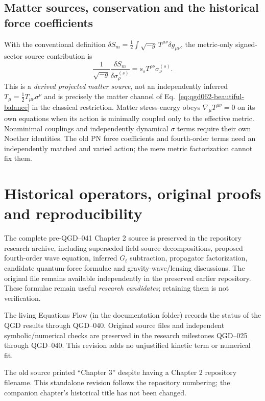 \documentclass[11pt,a4paper]{article}
\begin{document}
\subsection{Matter sources, conservation and the historical force coefficients}
With the conventional definition
$\delta S_m=\frac12\int\!\sqrt{-g}\,T^{\mu\nu}\delta g_{\mu\nu}$,
the metric-only signed-sector source contribution is
\begin{equation}\label{eq:qgd052-matter-source}
 \frac1{\sqrt{-g}}\frac{\delta S_m}{\delta\sigma_\rho^{(s)}}
 =s_s T^{\rho\nu}\sigma_\nu^{(s)}.
\end{equation}
This is a \emph{derived projected matter source}, not an independently inferred
$T_\mu=\frac12 T_{\mu\nu}\sigma^\nu$ and is precisely the matter channel of Eq.~\eqref{eq:qgd062-beautiful-balance} in the classical restriction.  Matter stress-energy obeys
$\nabla_\mu T^{\mu\nu}=0$ on its own equations when its action is
minimally coupled only to the effective metric.  Nonminimal couplings and
independently dynamical $\sigma$ terms require their own Noether identities.
The old PN force coefficients and fourth-order terms need an independently
matched and varied action; the mere metric factorization cannot fix them.

\section{Historical operators, original proofs and reproducibility}\label{app:archival}
The complete pre-QGD--041 Chapter 2 source is preserved in the repository research archive, including superseded field-source decompositions, proposed fourth-order wave equation, inferred $G_t$ subtraction, propagator factorization, candidate quantum-force formulae and gravity-wave/lensing discussions. The original file remains available independently in the preserved earlier repository. These formulae remain useful \emph{research candidates}; retaining them is not verification.

The living Equations Flow (in the documentation folder) records the status of the QGD results through QGD--040. Original source files and independent symbolic/numerical checks are preserved in the research milestones QGD--025 through QGD--040. This revision adds no unjustified kinetic term or numerical fit.

The old source printed ``Chapter 3'' despite having a Chapter 2 repository filename. This standalone revision follows the repository numbering; the companion chapter's historical title has not been changed.
\end{document}
